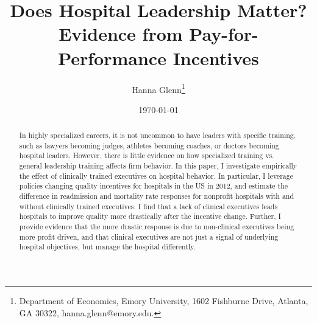 \documentclass[12pt]{article}
\begin{document}
	
	
	
	
	\linespread{1.2}\title{\vspace{-0.5in} Does Hospital Leadership Matter?\\ \large Evidence from Pay-for-Performance Incentives} 
	
	\date{\today}
	
	\author{\vspace{10mm}Hanna Glenn\footnote{Department of Economics, Emory University, 1602 Fishburne Drive, Atlanta, GA 30322, hanna.glenn@emory.edu.} }
	
	\maketitle
	
	\vspace{-0.2in}
	
	\singlespacing\maketitle


 \vspace{3mm}
	
    \begin{abstract}
		{\small
        In highly specialized careers, it is not uncommon to have leaders with specific training, such as lawyers becoming judges, athletes becoming coaches, or doctors becoming hospital leaders. However, there is little evidence on how specialized training vs. general leadership training affects firm behavior. In this paper, I investigate empirically the effect of clinically trained executives on hospital behavior. In particular, I leverage policies changing quality incentives for hospitals in the US in 2012, and estimate the difference in readmission and mortality rate responses for nonprofit hospitals with and without clinically trained executives. I find that a lack of clinical executives leads hospitals to improve quality more drastically after the incentive change. Further, I provide evidence that the more drastic response is due to non-clinical executives being more profit driven, and that clinical executives are not just a signal of underlying hospital objectives, but manage the hospital differently. 
		} 
	\end{abstract}
	
	
	
	
	\vspace{0.8in}
	
\end{document}
